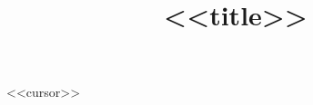 \documentclass{book}
\title{
	\begin{huge}
		\bf{<<title>>}
	\end{huge}
	}
\author{\documentauthor}
\begin{document}
\maketitle
\tableofcontents

<<cursor>>

\newpage
\printbibliography
\end{document}
